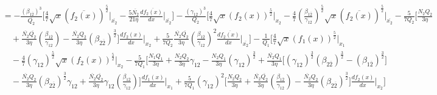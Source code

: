 \documentclass[fleqn, 10pt]{article}
\begin{document}
            \begin{equation*}
            \begin{split}
            &=     - \frac{(\beta_{1\overline{2}})^3}{\overline{Q_2}} \Biggl[ \frac{4}{7} \sqrt{x} (\overline{f_2(x)})^\frac{5}{2} \Bigg|_{\overline{x_2}} - \frac{5 \overline{N_2}}{21 \eta} \frac{d\overline{f_2(x)}}{dx} \Bigg|_{\overline{x_2}} \Biggr] -   \frac{(\gamma_{12})^3}{Q_2} \Biggl[ \frac{4}{7} \sqrt{x} (f_2(x))^\frac{5}{2} \Bigg|_{x_2} -   \frac{4}{7} \left(\frac{\beta_{1\overline{2}}}{\gamma_{12}}\right)^\frac{5}{2} \sqrt{x} (\overline{f_2(x)})^\frac{5}{2} \Bigg|_{\overline{x_2}} - \frac{5}{7Q_2} \Biggl[ \frac{N_2 Q_2}{3 \eta} \\ & \quad + \frac{\overline{N_2} \overline{Q_2}}{3 \eta} \left(\frac{\beta_{1\overline{2}}}{\gamma_{12}}\right) -  \frac{\overline{N_2} Q_2}{3 \eta} (\beta_{2\overline{2}})^\frac{3}{2} \Biggr] \frac{df_2(x)}{dx} \Bigg|_{x_2} +   \frac{5}{7Q_2} \frac{\overline{N_2} \overline{Q_2}}{3 \eta} \left(\frac{\beta_{1\overline{2}}}{\gamma_{12}}\right)^2 \frac{d\overline{f_2(x)}}{dx} \Bigg|_{\overline{x_2}} \Biggr] -   \frac{1}{Q_1} \Biggl[ \frac{4}{7} \sqrt{x} (f_1(x))^\frac{5}{2} \Bigg|_{x_1} \\ & \quad -   \frac{4}{7} (\gamma_{12})^\frac{5}{2} \sqrt{x} (f_2(x))^\frac{5}{2} \Bigg|_{x_2}  - \frac{5}{7Q_1} \Biggl[ \frac{N_1 Q_1}{3 \eta} + \frac{N_2 Q_2}{3 \eta} \gamma_{12} - \frac{N_2 Q_1}{3 \eta} (\gamma_{12})^\frac{3}{2} + \frac{\overline{N_2} Q_1}{3 \eta} \bigl[ (\gamma_{12})^\frac{3}{2} (\beta_{2\overline{2}})^\frac{3}{2} - (\beta_{1\overline{2}})^\frac{3}{2} \bigr] \\ & \quad - \frac{\overline{N_2} Q_2}{3 \eta} (\beta_{2\overline{2}})^\frac{3}{2} \gamma_{12} +   \frac{\overline{N_2} \overline{Q_2}}{3 \eta} \gamma_{12} \left(\frac{\beta_{1\overline{2}}}{\gamma_{12}}\right) \Biggr] \frac{df_1(x)}{dx} \Bigg|_{x_1}  + \frac{5}{7 Q_1} (\gamma_{12})^2 \Biggl[ \frac{N_2 Q_2}{3 \eta} + \frac{\overline{N_2} \overline{Q_2}}{3 \eta} \left(\frac{\beta_{1\overline{2}}}{\gamma_{12}}\right) -   \frac{\overline{N_2} Q_2}{3 \eta} (\beta_{2\overline{2}})^\frac{3}{2} \Biggr] \frac{df_2(x)}{dx} \Bigg|_{x_2} \Biggr]
            \end{split}
            \end{equation*}
\end{document}
